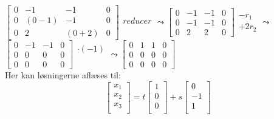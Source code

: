 \documentclass[a4paper,12pt]{article}
\begin{document}
$
\left[\begin{array}{ccc|c}
    0 & -1 & -1 & 0\\
    0 & (0-1) & -1 & 0\\
    0 & 2 & (0+2) & 0
\end{array}\right]
\begin{array}{ccc}
    \\
    reducer\\
    \\
\end{array}
\leadsto
\left[\begin{array}{ccc|c}
    0 & -1 & -1 & 0 \\
    0 & -1 & -1 & 0 \\
    0 & 2 & 2 & 0
\end{array}\right]
\begin{array}{ccc}
    \\
    -r_1\\
    +2r_2\\
\end{array}
\leadsto
$\\
$
\left[\begin{array}{ccc|c}
    0 & -1 & -1 & 0 \\
    0 & 0 & 0 & 0 \\
    0 & 0 & 0 & 0
\end{array}\right]
\begin{array}{ccc}
    \cdot (-1)\\
    \\
    \\
\end{array}
\leadsto
\left[\begin{array}{ccc|c}
    0 & 1 & 1 & 0 \\
    0 & 0 & 0 & 0 \\
    0 & 0 & 0 & 0
\end{array}\right]
$\\

Her kan løsningerne aflæses til:\\

\[
\left[\begin{array}{ccc}
    x_1\\
    x_2\\
    x_3\\
\end{array}\right]
=
t
\left[\begin{array}{ccc}
    1\\
    0\\
    0\\
\end{array}\right]
+
s
\left[\begin{array}{ccc}
    0\\
    -1\\
    1\\
\end{array}\right]
\]
\end{document}
